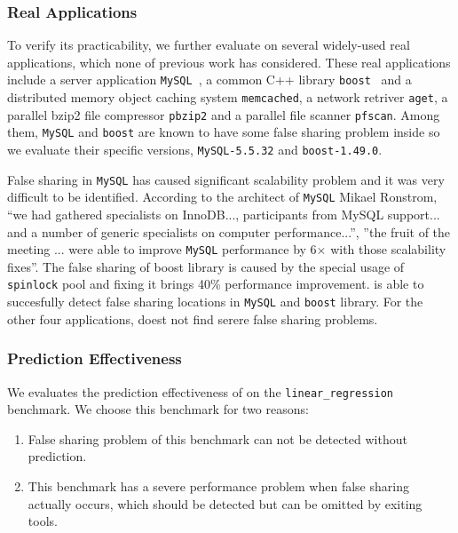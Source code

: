 \subsubsection{Real Applications}
To verify its practicability, we further evaluate  
on several widely-used real applications, which none of previous work has considered.  
These real applications include a server application \texttt{MySQL}~\cite{mysql}, 
a common C++ library \texttt{boost}~\cite{libfalsesharing} 
and a distributed memory object caching system \texttt{memcached}, a network retriver \texttt{aget}, 
a parallel bzip2 file compressor \texttt{pbzip2} and a parallel file scanner \texttt{pfscan}.
Among them, \texttt{MySQL} and \texttt{boost} are known to have some false sharing problem inside 
so we evaluate their specific versions, \texttt{MySQL-5.5.32} and
\texttt{boost-1.49.0}.

False sharing in \texttt{MySQL} has caused significant scalability problem and
it was very difficult to be identified. 
According to the architect of \texttt{MySQL} Mikael Ronstrom, ``we had gathered specialists on 
InnoDB..., participants from MySQL support... and a number of generic specialists on 
computer performance...'', ''the fruit of the meeting ... were able to 
improve \texttt{MySQL} performance by 6$\times$ with those scalability fixes''. 
The false sharing of boost library is caused by the special usage of \texttt{spinlock} pool and fixing
it brings 40\% performance improvement. 
 is able to succesfully detect false sharing locations
in \texttt{MySQL} and \texttt{boost} library. 
For the other four applications,  doest not find serere false sharing problems.

\subsubsection{Prediction Effectiveness}
\label{sec:predicteval}
We evaluates the prediction effectiveness of  on the \texttt{linear\_regression} benchmark.
We choose this benchmark for two reasons:
\begin{enumerate}
\item
False sharing problem of this benchmark can not be detected without prediction. 

\item
This benchmark has a severe performance problem when false sharing actually occurs, which should be 
detected but can be omitted by exiting tools.
\end{enumerate}

